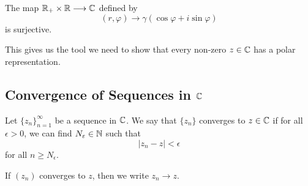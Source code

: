 \documentclass[a4paper]{report}
\begin{document}
\begin{prop}
    The map \( {\mathbb{R}}_{+} \times \mathbb{R} \longrightarrow \mathbb{C}^{} \) defined by 
    \[  (r, \varphi) \longrightarrow \gamma ( \cos \varphi + i \sin \varphi) \]
    is surjective.
\end{prop}

\begin{remark}
    This gives us the tool we need to show that every non-zero \( z \in \mathbb{C}  \) has a polar representation.
\end{remark}

\subsection{Convergence of Sequences in \( \C \)}\label{Convergence of Sequences in the Complex Numbers}

\begin{definition}[Convergence in \( \C  \)]
    Let \( {\{ {z}_{n} \} }_{n=1}^{\infty }     \) be a sequence in \( \C  \). We say that \( \{ {z}_{n} \}   \) converges to \( z \in \mathbb{C}  \) if for all \(  \epsilon > 0  \), we can find \( {N}_{\varepsilon} \in \mathbb{N}  \) such that  
    \[  | {z}_{n} - z  |  < \epsilon \]
    for all \( n \geq {N}_{\epsilon} \).
\end{definition}

If \( ({z}_{n}) \) converges to \( z  \), then we write \( {z}_{n} \to z  \).
\end{document}
